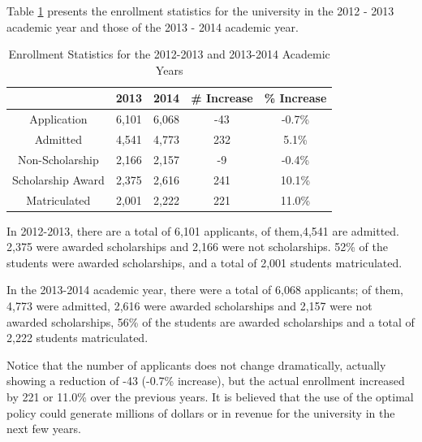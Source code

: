 \documentclass[12pt,english]{report}
\begin{document}
Table \ref{enroll_stats} presents the enrollment statistics for the university
in the 2012 - 2013 academic year and those of the 2013 - 2014 academic year.

\begin{table}[ht!]
\centering
\begin{tabular}{|c|c|c|c|c|}
\hline
& 2013 & 2014 & \# Increase & \% Increase \\ \hline
Application                    & 6,101 & 6,068 & -43         & -0.7\%      \\
\hline
Admitted                       & 4,541 & 4,773 & 232         & 5.1\%       \\
\hline
Non-Scholarship                & 2,166 & 2,157 & -9          & -0.4\%      \\
\hline
Scholarship Award              & 2,375 & 2,616 & 241         & 10.1\%      \\
\hline
Matriculated                   & 2,001 & 2,222 & 221         & 11.0\%      \\
\hline
\end{tabular}
\caption{Enrollment Statistics for the 2012-2013 and 2013-2014 Academic Years}
\label{enroll_stats}

\end{table}

In 2012-2013, there are a total of 6,101 applicants, of them,4,541   are
admitted. 2,375 were awarded scholarships and 2,166 were not scholarships. 52\%
of the students were awarded scholarships, and a total of 2,001 students
matriculated.

In the 2013-2014 academic year, there were a total of 6,068 applicants; of
them, 4,773 were admitted, 2,616 were awarded scholarships and 2,157 were not
awarded scholarships, 56\% of the students are awarded scholarships and a total
of 2,222 students matriculated.

Notice that the number of applicants does not change dramatically, actually
showing a reduction of -43 (-0.7\% increase), but the actual enrollment
increased by 221  or 11.0\% over the previous years.  It is believed that the
use of the optimal policy could generate millions of dollars or in revenue for
the university in the next few years.
\end{document}
